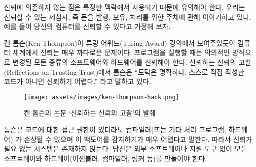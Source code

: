 \begin{comment}
	Note that \textit{without relying on trust} is used in a very specific context
	here. We are talking about trusted third parties, i.e. other entities
	which you trust to produce, hold, and process your money. It is assumed,
	for example, that you can trust your computer.
\end{comment}
신뢰에 의존하지 않는 점은 특정한 맥락에서 사용되기 때문에 유의해야 한다.
우리는 신뢰할 수 있는 제삼자, 즉 돈을 발행, 보유, 처리를 위한 주체에 관해 이야기하고 있다.
예를 들어 당신의 컴퓨터를 신뢰할 수 있다고 가정해 보자.

\begin{comment}
	As Ken Thompson showed in his Turing Award lecture, trust is an
	extremely tricky thing in the computational world. When running a
	program, you have to trust all kinds of software (and hardware) which,
	in theory, could alter the program you are trying to run in a malicious
	way. As Thompson summarized in his \textit{Reflections on Trusting Trust}:
	\enquote{The moral is obvious. You can't trust code that you did not totally
		create yourself.}~\cite{trusting-trust}
\end{comment}
켄 톰슨(Ken Thompson)이 튜링 어워드(Turing Award) 강의에서 보여주었듯이 컴퓨터 세계에서 신뢰는 매우 까다로운 문제이다.
프로그램을 실행할 때는 악의적인 방식으로 변경된 모든 종류의 소프트웨어와 하드웨어를 신뢰해야 한다.
신뢰하는 신뢰의 고찰(Reflections on Trusting Trust)에서 톰슨은
\enquote{도덕은 명확하다. 스스로 직접 작성한 코드가 아니면 신뢰하기 어렵다.}\cite{trusting-trust}
라고 말하고 있다.

\begin{figure}
	\texttt{[image: assets/images/ken-thompson-hack.png]}
	\caption{켄 톰슨의 논문 `신뢰하는 신뢰의 고찰'의 발췌}
	\label{fig:ken-thompson-hack}
\end{figure}

\begin{comment}
	Thompson demonstrated that even if you have access to the source code,
	your compiler --- or any other program-handling program or
	hardware --- could be compromised and detecting this backdoor would be
	very difficult. Thus, in practice, a truly \textit{trustless} system does not
	exist. You would have to create all your software \textit{and} all your
	hardware (assemblers, compilers, linkers, etc.) from scratch, without
	the aid of any external software or software-aided machinery.
\end{comment}
톰슨은 코드에 대한 접근 권한이 있더라도 컴파일러(또는 기타 처리 프로그램, 하드웨어)
가 손상될 수 있으며 이 백도어를 감지하기가 매우 어렵다고 말한다. 
따라서 신뢰가 필요 없는 시스템은 존재하지 않는다.
당신은 외부 소프트웨어나 지원 도구 없이 모든 소프트웨어와 하드웨어(어셈블러, 컴파일러, 링커 등)를 만들어야 한다.

